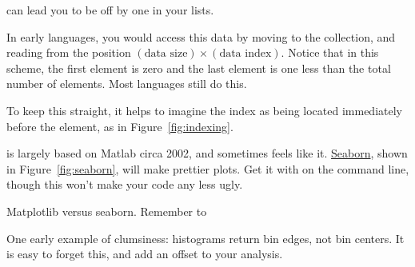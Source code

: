 \documentclass[justified, nobib]{tufte-handout}
\begin{document}
 can lead you to be off by one in your lists.


\begin{marginfigure}
    \def\svgwidth{140pt}{}
    \caption{%
    How to count in Python.
    Shaded elements correspond to those selected by indices [1:3]}
\label{fig:indexing}
\end{marginfigure}

\noindent
In early languages, you would access this data by moving to the collection, and reading from the position $(\text{data size}) \times (\text{data index})$.
Notice that in this scheme, the first element is zero and the last element is one less than the total number of elements.
Most languages still do this.



\noindent
To keep this straight, it helps to imagine the index as being located immediately before the element, as in Figure~\ref{fig:indexing}.

\smallskip

 is largely based on Matlab circa 2002, and sometimes feels like it. \href{https://stanford.edu/~mwaskom/software/seaborn/index.html}{Seaborn}, shown in Figure~\ref{fig:seaborn}, will make prettier plots.
Get it with  on the command line, though this won't make your code any less ugly.

\begin{marginfigure}
    \vspace*{\fill}
    \centering

    \def\svgwidth{140pt}

    \vspace*{\fill}
    \bigskip
    \def\svgwidth{140pt}
  \caption{Matplotlib versus seaborn.
  \hspace{\textwidth}Remember to }
\label{fig:seaborn}
\end{marginfigure}

\noindent
One early example of clumsiness: histograms return bin edges, not bin centers.
It is easy to forget this, and add an offset to your analysis.


\end{document}
